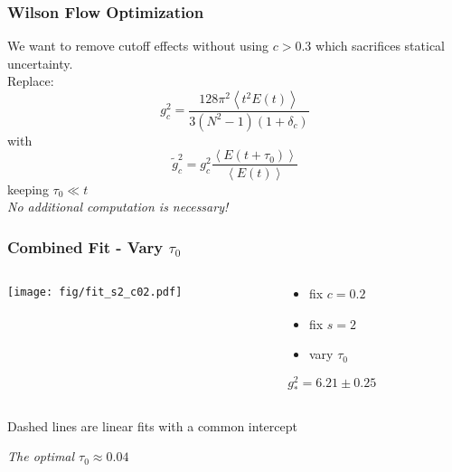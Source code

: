 \begin{frame}
  \frametitle{Wilson Flow Optimization}
  We want to remove cutoff effects without using $c>0.3$ which sacrifices statical uncertainty.\\
  \vspace{12pt}
  Replace:
  \begin{equation*}
    g_c^2=\frac{128\pi^2\left<t^2E(t)\right>}{3(N^2-1)(1+\delta_c)}
  \end{equation*}
  with
  \begin{equation*}
    \widetilde{g}_c^2=g_c^2\frac{\left<E(t+\tau_0)\right>}{\left<E(t)\right>}
  \end{equation*}
  keeping $\tau_0\ll t$\\
  \vspace{12pt}
  \emph{No additional computation is necessary!}
\end{frame}

\begin{frame}
  \frametitle{Combined Fit - Vary $\tau_0$}
  \begin{columns}[T]
    \begin{column}{.7\textwidth}
      \texttt{[image: fig/fit\_s2\_c02.pdf]}
    \end{column}
    \begin{column}{.3\textwidth}
      \begin{itemize}
        \item fix $c=0.2$
        \item fix $s=2$
        \item vary $\tau_0$
      \end{itemize}
      \vspace{24pt}
      $g^2_*=6.21\pm0.25$
    \end{column}
  \end{columns}
  \vspace{12pt}
  Dashed lines are linear fits with a common intercept\\
  \begin{center}\emph{The optimal $\tau_0\approx0.04$}\end{center}
\end{frame}

